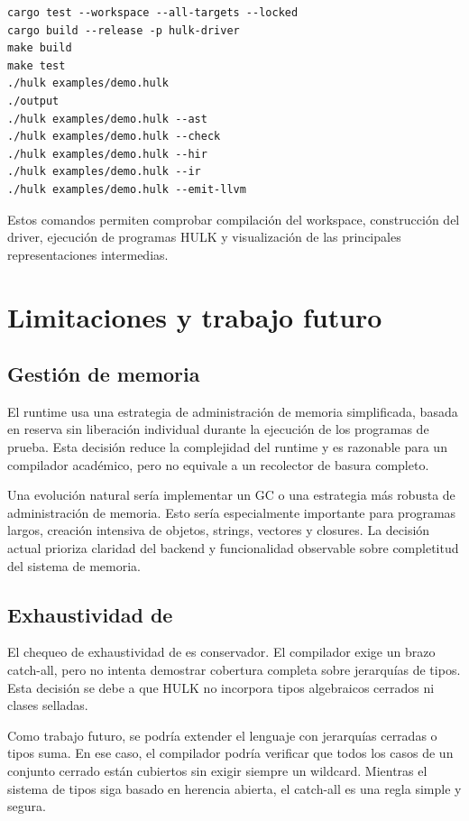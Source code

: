 \documentclass[12pt,letterpaper]{article}
\newcommand{\repo}[1]{\texttt{\detokenize{#1}}}
\newcommand{\hulk}{\textsc{HULK}}
\begin{document}
\begin{lstlisting}[language=IR,caption={Comandos principales de validación}]
cargo test --workspace --all-targets --locked
cargo build --release -p hulk-driver
make build
make test
./hulk examples/demo.hulk
./output
./hulk examples/demo.hulk --ast
./hulk examples/demo.hulk --check
./hulk examples/demo.hulk --hir
./hulk examples/demo.hulk --ir
./hulk examples/demo.hulk --emit-llvm
\end{lstlisting}

Estos comandos permiten comprobar compilación del workspace, construcción del driver, ejecución de programas \hulk{} y visualización de las principales representaciones intermedias.

\section{Limitaciones y trabajo futuro}

\subsection{Gestión de memoria}

El runtime usa una estrategia de administración de memoria simplificada, basada en reserva sin liberación individual durante la ejecución de los programas de prueba. Esta decisión reduce la complejidad del runtime y es razonable para un compilador académico, pero no equivale a un recolector de basura completo.

Una evolución natural sería implementar un GC o una estrategia más robusta de administración de memoria. Esto sería especialmente importante para programas largos, creación intensiva de objetos, strings, vectores y closures. La decisión actual prioriza claridad del backend y funcionalidad observable sobre completitud del sistema de memoria.

\subsection{Exhaustividad de \repo{match}}

El chequeo de exhaustividad de \repo{match} es conservador. El compilador exige un brazo catch-all, pero no intenta demostrar cobertura completa sobre jerarquías de tipos. Esta decisión se debe a que \hulk{} no incorpora tipos algebraicos cerrados ni clases selladas.

Como trabajo futuro, se podría extender el lenguaje con jerarquías cerradas o tipos suma. En ese caso, el compilador podría verificar que todos los casos de un conjunto cerrado están cubiertos sin exigir siempre un wildcard. Mientras el sistema de tipos siga basado en herencia abierta, el catch-all es una regla simple y segura.
\end{document}
